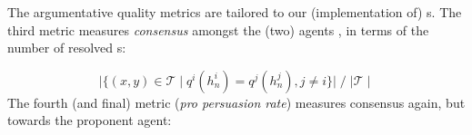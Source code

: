         


The argumentative quality metrics 
are tailored to our (implementation of) \FAXIC s. The third metric measures \emph{consensus} amongst the (two) agents%
, in terms of the number of resolved \FAXIC s:
\iffalse 
        \begin{align*}
            \frac{ \Big| \{(x, y) \in \mathcal{T} \mid q^i (h^i_n) = q^j (h^j_n), %
            j \neq i \}\Big|}{\mid \mathcal{T} \mid}
        \end{align*}
      \fi 

\vspace*{-0.1cm}
\[
\Big| \{(x, y) \in \mathcal{T} \mid q^i (h^i_n) = q^j (h^j_n), %
            j \neq i \}\Big|
            \; / \; {\mid \mathcal{T} \mid}
            \]
The fourth (and final) metric (\emph{pro persuasion rate}) measures  consensus again, but towards the proponent agent:   

\iffalse 
        \begin{align*}
             \frac{ \Big| \{ (x, y) \in \mathcal{T} \mid q^1 (h^1_0) = q^j (h^j_n),  j \neq 1 \}\Big|}{\mid \mathcal{T} \mid} 
        \end{align*}
        \fi 

